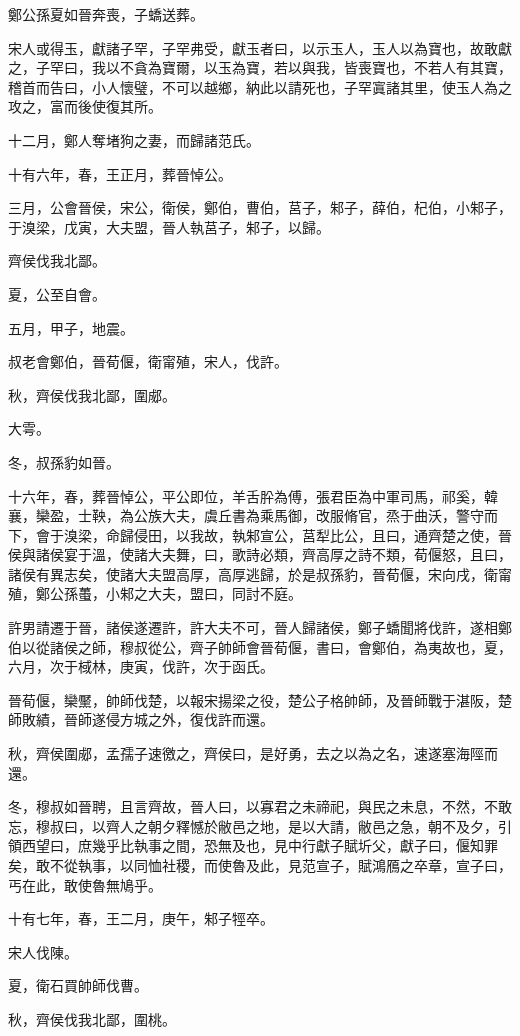 \begin{pinyinscope}
鄭公孫夏如晉奔喪，子蟜送葬。

宋人或得玉，獻諸子罕，子罕弗受，獻玉者曰，以示玉人，玉人以為寶也，故敢獻之，子罕曰，我以不貪為寶爾，以玉為寶，若以與我，皆喪寶也，不若人有其寶，稽首而告曰，小人懷璧，不可以越鄉，納此以請死也，子罕寘諸其里，使玉人為之攻之，富而後使復其所。

十二月，鄭人奪堵狗之妻，而歸諸范氏。

十有六年，春，王正月，葬晉悼公。

三月，公會晉侯，宋公，衛侯，鄭伯，曹伯，莒子，邾子，薛伯，杞伯，小邾子，于溴梁，戊寅，大夫盟，晉人執莒子，邾子，以歸。

齊侯伐我北鄙。

夏，公至自會。

五月，甲子，地震。

叔老會鄭伯，晉荀偃，衛甯殖，宋人，伐許。

秋，齊侯伐我北鄙，圍郕。

大雩。

冬，叔孫豹如晉。

十六年，春，葬晉悼公，平公即位，羊舌肸為傅，張君臣為中軍司馬，祁奚，韓襄，欒盈，士鞅，為公族大夫，虞丘書為乘馬御，改服脩官，烝于曲沃，警守而下，會于溴梁，命歸侵田，以我故，執邾宣公，莒犁比公，且曰，通齊楚之使，晉侯與諸侯宴于溫，使諸大夫舞，曰，歌詩必類，齊高厚之詩不類，荀偃怒，且曰，諸侯有異志矣，使諸大夫盟高厚，高厚逃歸，於是叔孫豹，晉荀偃，宋向戌，衛甯殖，鄭公孫蠆，小邾之大夫，盟曰，同討不庭。

許男請遷于晉，諸侯遂遷許，許大夫不可，晉人歸諸侯，鄭子蟜聞將伐許，遂相鄭伯以從諸侯之師，穆叔從公，齊子帥師會晉荀偃，書曰，會鄭伯，為夷故也，夏，六月，次于棫林，庚寅，伐許，次于函氏。

晉荀偃，欒黶，帥師伐楚，以報宋揚梁之役，楚公子格帥師，及晉師戰于湛阪，楚師敗績，晉師遂侵方城之外，復伐許而還。

秋，齊侯圍郕，孟孺子速徼之，齊侯曰，是好勇，去之以為之名，速遂塞海陘而還。

冬，穆叔如晉聘，且言齊故，晉人曰，以寡君之未禘祀，與民之未息，不然，不敢忘，穆叔曰，以齊人之朝夕釋憾於敝邑之地，是以大請，敝邑之急，朝不及夕，引領西望曰，庶幾乎比執事之間，恐無及也，見中行獻子賦圻父，獻子曰，偃知罪矣，敢不從執事，以同恤社稷，而使魯及此，見范宣子，賦鴻鴈之卒章，宣子曰，丐在此，敢使魯無鳩乎。

十有七年，春，王二月，庚午，邾子牼卒。

宋人伐陳。

夏，衛石買帥師伐曹。

秋，齊侯伐我北鄙，圍桃。


\end{pinyinscope}
